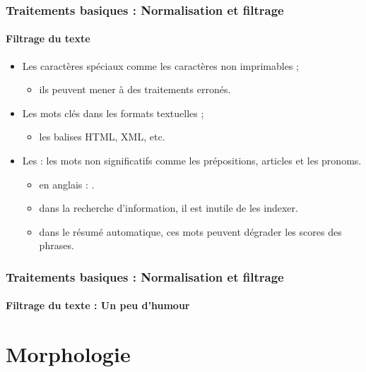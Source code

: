 \documentclass[xcolor=table]{beamer}
\begin{document}
\begin{frame}
\frametitle{Traitements basiques : Normalisation et filtrage}
\framesubtitle{Filtrage du texte}

\begin{itemize}
	\item Les caractères spéciaux comme les caractères non imprimables ;
	\begin{itemize}
		\item ils peuvent mener à des traitements erronés. 
	\end{itemize}
	\item Les mots clés dans les formats textuelles ;
	\begin{itemize}
		\item les balises HTML, XML, etc. 
	\end{itemize}
	\item Les  : les mots non significatifs comme les prépositions, articles et les pronoms.
	\begin{itemize}
		\item en anglais : .
		\item dans la recherche d'information, il est inutile de les indexer.
		\item dans le résumé automatique, ces mots peuvent dégrader les scores des phrases.
	\end{itemize}
\end{itemize}

\end{frame}

\begin{frame}
\frametitle{Traitements basiques : Normalisation et filtrage}
\framesubtitle{Filtrage du texte : Un peu d'humour}

\begin{center}
\end{center}

\end{frame}

\section{Morphologie}
\end{document}
